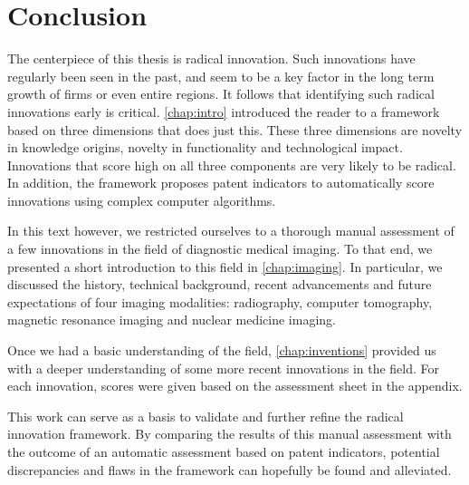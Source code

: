 \chapter{Conclusion}\label{chap:conclusions}
The centerpiece of this thesis is radical innovation. Such innovations have
regularly been seen in the past, and seem to be a key factor in the long term
growth of firms or even entire regions. It follows that identifying such radical
innovations early is critical. \autoref{chap:intro} introduced the reader to a
framework based on three dimensions that does just this. These three
dimensions are novelty in knowledge origins, novelty in functionality
and technological impact. Innovations that score high on all three components
are very likely to be radical. In addition, the framework proposes patent
indicators to automatically score innovations using complex computer algorithms.

In this text however, we restricted ourselves to a thorough manual assessment of
a few innovations in the field of diagnostic medical imaging. To that end, we
presented a short introduction to this field in \autoref{chap:imaging}. In
particular, we discussed the history, technical background, recent advancements
and future expectations of four imaging modalities: radiography, computer
tomography, magnetic resonance imaging and nuclear medicine imaging.

Once we had a basic understanding of the field, \autoref{chap:inventions}
provided us with a deeper understanding of some more recent innovations in the
field. For each innovation, scores were given based on the assessment sheet in
the appendix. %

This work can serve as a basis to validate and further refine the radical
innovation framework. By comparing the results of this manual assessment with
the outcome of an automatic assessment based on patent indicators, potential
discrepancies and flaws in the framework can hopefully be found and alleviated.